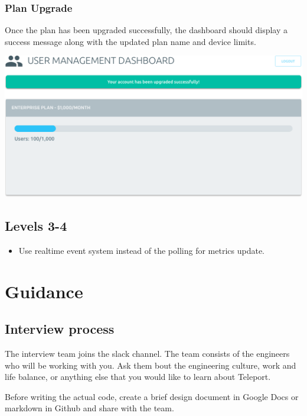 \documentclass{article}
\begin{document}
  \subsubsection{Plan Upgrade}

  Once the plan has been upgraded successfully, the dashboard should display a success message along with the updated plan name and device limits. 

  \begin{center}
    \includegraphics[width=\textwidth]{dashboard-upgraded}
  \end{center}

  \subsection*{Levels 3-4}

  \begin{itemize}
  \item Use realtime event system instead of the polling for metrics update.
  \end{itemize}

\section{Guidance}

\subsection{Interview process}

The interview team joins the slack channel. The team consists of the engineers who will be working with you.
Ask them bout the engineering culture, work and life balance, or anything else that you would like to learn about Teleport.
  
Before writing the actual code, create a brief design document in Google Docs or markdown in Github and share with the team.
\end{document}
